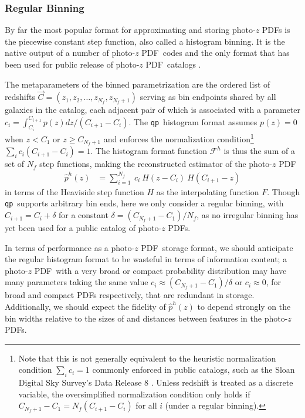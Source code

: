 \documentclass[\docopts]{\docclass}
\newcommand{\qp}{\texttt{qp}}
\newcommand{\pz}{photo-$z$ PDF}
\begin{document}
\subsubsection{Regular Binning}
\label{sec:bins}

By far the most popular format for approximating and storing \pz s is the 
piecewise constant step function, also called a histogram binning.
It is the native output of a number of \pz\ codes 
\citep{carrasco_kind_somz:_2014, sadeh_annz2:_2016, cavuoti_metaphor:_2017} and 
the only format that has been used for public release of \pz\ catalogs 
\citep{sheldon_photometric_2012, tanaka_photometric_2017, de_jong_third_2017}.

The metaparameters of the binned parametrization are the ordered list of 
redshifts $\vec{C} = (z_{1}, z_{2}, \dots, z_{N_{f}}, z_{N_{f}+1})$ serving as 
bin endpoints shared by all galaxies in the catalog, each adjacent pair of 
which is associated with a parameter $c_{i} = \int_{C_{i}}^{C_{i+1}} p(z) dz / 
(C_{i+1} - C_{i})$.
The \qp\ histogram format assumes $p(z)=0$ when $z<C_{1}$ or $z\geq 
C_{N_{f}+1}$ and enforces the normalization condition\footnote{
Note that this is not generally equivalent to the heuristic normalization 
condition $\sum_{i} c_{i} = 1$ commonly enforced in public catalogs, such as 
the Sloan Digital Sky Survey's Data Release 8 \citep{sheldon_photometric_2012}.
Unless redshift is treated as a discrete variable, the oversimplified 
normalization condition only holds if $C_{N_{f}+1} - C_{1} = N_{f} (C_{i+1} - 
C_{i})$ for all $i$ (under a regular binning).
}
$\sum_{i} c_{i} (C_{i+1} - C_{i}) = 1$.
The histogram format function $\mathcal{F}^{h}$ is thus the sum of a set of 
$N_{f}$ step functions, making the reconstructed estimator of the \pz
\begin{align}
  \label{eq:binned}
  \hat{p}^{h}(z) &= \sum_{i=1}^{N_{f}}\ c_{i}\ H(z - C_{i})\ H(C_{i+1} - z)
\end{align}
in terms of the Heaviside step function $H$ as the interpolating function $F$.
Though \qp\ supports arbitrary bin ends, here we only consider a regular 
binning, with $C_{i+1} = C_{i} + \delta$ for a constant $\delta = (C_{N_{f}+1} 
- C_{1}) / N_{f}$, as no irregular binning has yet been used for a public 
catalog of \pz s.

In terms of performance as a \pz\ storage format, we should anticipate the 
regular histogram format to be wasteful in terms of information content; a \pz\ 
with a very broad or compact probability distribution may have many parameters 
taking the same value $c_{i} \approx (C_{N_{f}+1} - C_{1}) / \delta$ or $c_{i} 
\approx 0$, for broad and compact PDFs respectively, that are redundant in 
storage.
Additionally, we should expect the fidelity of $\hat{p}^{h}(z)$ to depend 
strongly on the bin widths relative to the sizes of and distances between 
features in the \pz s.
\end{document}
